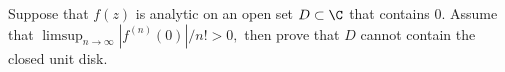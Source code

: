 Suppose that $f(z)$ is analytic on an open set $D\subset \C$ that
contains $0$. Assume that $\limsup_{n\rightarrow
\infty}|f^{(n)}(0)|/n!>0,$ then prove that $D$ cannot contain the
closed unit disk.
